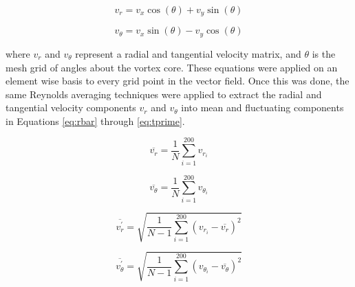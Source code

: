 \begin{equation}
v_{r} = v_{x} \cos{(\theta)} + v_{y} \sin{(\theta)}
\label{eq:uv_r}
\end{equation}

\begin{equation}
v_{\theta} = v_{x} \sin{(\theta)} - v_{y} \cos{(\theta)}
\label{eq:uv_t}
\end{equation}

\noindent
where $v_{r}$ and $v_{\theta}$ represent a radial and tangential velocity 
matrix, and $\theta$ is the mesh grid of angles 
about the vortex core. These equations were applied on an element wise basis to 
every grid point in the vector field. Once this was done, the same Reynolds 
averaging techniques were applied to extract the radial and tangential velocity 
components $v_{r}$ and $v_{\theta}$ into mean and fluctuating components in 
Equations 
\ref{eq:rbar} through \ref{eq:tprime}.

\begin{equation}
\overline{v_r}  = \frac{1}{N} \sum_{i=1}^{200} v_{r_i}
\label{eq:rbar}
\end{equation}

\begin{equation}
\overline{v_\theta}  = \frac{1}{N} \sum_{i=1}^{200} v_{\theta_i}
\label{eq:tbar}
\end{equation}

\begin{equation}
\overline{v_r^\prime} = \sqrt{\frac{1}{N-1} \sum_{i=1}^{200} (v_{r_i} - 
\overline{v_r})^2}
\label{eq:rprime}
\end{equation}

\begin{equation}
\overline{v_\theta^\prime} = \sqrt{\frac{1}{N-1} \sum_{i=1}^{200} (v_{\theta_i} 
- 
\overline{v_\theta})^2}
\label{eq:tprime}
\end{equation}

